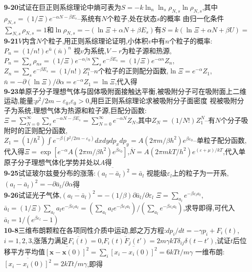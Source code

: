 \documentclass[10pt,a4paper]{article}
\begin{document}
\begin{multicols}{2}
\textbf{9-20}试证在巨正则系综理论中熵可表为$S=-k\ln_n\ln_s\rho_{N,s}\ln\rho_{N,s}$,其中$\rho_{N,s}=(1/\Xi)e^{-\alpha N-\beta E_s}$--系统有$N$个粒子,处在状态$s$的概率\quad\quad
由归一化条件$\sum_{N,s}\rho_{N,s}=1$和$\ln\rho_{N,s}=-(\ln\Xi+\alpha N+\beta E_s)$有$S=k(\ln\Xi+\alpha N+\beta U)=$\\
\textbf{9-21}$V$内含$N$个粒子,用正则系综理论证明,小体积$v$中有$n$个粒子的概率:$P_n=(1/n!)e^{\bar{n}}(\bar{n})^n$\quad\quad
视$v$为系统,$V-r$为粒子源和热源,$P_n=\sum_s\rho_{ns}=(1/\Xi)e^{-\alpha/n}\sum_se^{-\beta E_s}=(1/\Xi)e^{-\alpha n}Z_n$,$Z_n=\sum_se^{-\beta E_s}=(1/n!)Z_1^n$--$n$个粒子的正则配分函数,$\ln\Xi=e^{-\alpha}Z_1$,$\bar{n}=-\partial(\ln\Xi)/\partial\alpha=e^{-\alpha}Z_1=\ln\Xi$,代入得\\
\textbf{9-23}单原子分子理想气体与固体吸附面接触达平衡,被吸附分子可在吸附面上二维运动,能量:$p^2/2m-\varepsilon_0$,$\varepsilon_0>0$,用巨正则系综理论求被吸附分子面密度\quad\quad
视被吸附分子为系统,理想气体为热源和粒子源,巨配分函数:$\Xi=\sum_{N=0}^{\infty}\sum_se^{-\alpha N-\beta E_s}=\sum_{N=0}^{\infty}e^{-\alpha N}Z_N$,其中$Z_N=(1/N!)Z_1^N$--有$N$个分子吸附时的正则配分函数,$Z_1=(1/\hbar^2)\int e^{-\beta(p^2/2m-\varepsilon_0)}dxdydp_xdp_y=A(2\pi m/\beta h^2)e^{\beta\varepsilon_0}$--单粒子配分函数,代入得$\Xi=\exp[e^{-\alpha}A(2\pi m/\beta h^2)e^{\beta\varepsilon_0}]$,$\overline{N}=A(2\pi mkT/h^2)e^{(\varepsilon+\mu)/kT}$,代入单原子分子理想气体化学势并处以$A$得\\
\textbf{9-25}试证玻尔兹曼分布的涨落:$\overline{(a_l-\bar{a}_l)^2}=\bar{a}_l$\quad\quad
视能级$\varepsilon_l$上的粒子为一开系,$\overline{(a_l-\bar{a}_l)^2}=-\partial\bar{a}_l/\partial\alpha$得\\
\textbf{9-26}试证光子气体,$\overline{(a_l-\bar{a}_l)^2}=-(1/\beta)\partial\bar{a}_l/\partial\varepsilon_l$\quad\quad
$\Xi=\sum_{a_l}e^{-\beta\varepsilon_la_l}$,$\bar{a}_l=(1/\Xi)\sum_{a_l}a_le^{-\beta\varepsilon_la_l}=(\sum_{a_l}a_le^{-\beta\varepsilon_la_l})/(\sum_{a_l}e^{-\beta\varepsilon_la_l})$,求导即得,可代入$\bar{a}_l=1/(e^{\beta\varepsilon_l}-1)$\\
\textbf{10-8}三维布朗颗粒在各项同性介质中运动,郎之万方程:$dp_i/dt=-\gamma p_i+F_i(t)$,$i=1,2,3$,涨落力满足$\overline{F_i(t)}=0$,$\overline{F_i(t)F_j(t')}=2m\gamma kT\delta_{ij}\delta(t-t')$,试证$t$后位移平方平均值$\overline{[\bm{x}-\bm{x}(0)]^2}=\sum_i\overline{[x_i-x_i(0)]^2}=6kTt/m\gamma$\quad\quad
一维布朗:$\overline{[x_i-x_i(0)]^2}=2kTt/m\gamma$,即得
\end{multicols}
\end{document}
